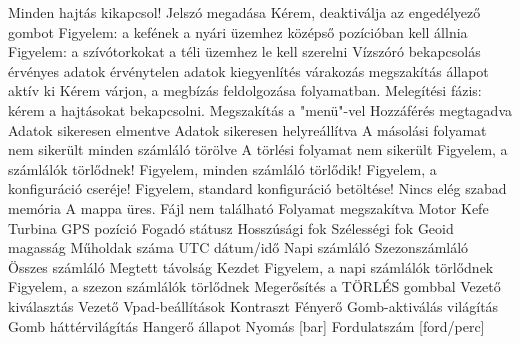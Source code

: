  {Minden hajtás kikapcsol!}
 {Jelszó megadása}
 {Kérem, deaktiválja az engedélyező gombot}
 {Figyelem: a kefének a nyári üzemhez középső pozícióban kell állnia}
 {Figyelem: a szívótorkokat a téli üzemhez le kell szerelni}
 {Vízszóró bekapcsolás}
 {érvényes adatok}
 {érvénytelen adatok}
 {kiegyenlítés}
 {várakozás}
 {megszakítás}
 {állapot}
 {aktív}
 {ki}
 {Kérem várjon, a megbízás feldolgozása folyamatban.}
 {Melegítési fázis: kérem a hajtásokat bekapcsolni.}
 {Megszakítás a "menü"-vel}
 {Hozzáférés megtagadva}
 {Adatok sikeresen elmentve}
 {Adatok sikeresen helyreállítva}
 {A másolási folyamat nem sikerült}
 {minden számláló törölve}
 {A törlési folyamat nem sikerült}
 {Figyelem, a számlálók törlődnek!}
 {Figyelem, minden számláló törlődik!}
 {Figyelem, a konfiguráció cseréje!}
 {Figyelem, standard konfiguráció betöltése!}
 {Nincs elég szabad memória}
 {A mappa üres.}
 {Fájl nem található}
 {Folyamat megszakítva}
 {Motor}
 {Kefe}
 {Turbina}
 {GPS pozíció}
 {Fogadó státusz}
 {Hosszúsági fok}
 {Szélességi fok}
 {Geoid magasság}
 {Műholdak száma}
 {UTC dátum/idő}
 {Napi számláló}
 {Szezonszámláló}
 {Összes számláló}
 {Megtett távolság}
 {Kezdet}
 {Figyelem, a napi számlálók törlődnek}
 {Figyelem, a szezon számlálók törlődnek}
 {Megerősítés a TÖRLÉS gombbal}
 {Vezető kiválasztás}
 {Vezető}
 {Vpad-beállítások}
 {Kontraszt}
 {Fényerő}
 {Gomb-aktiválás világítás}
 {Gomb háttérvilágítás}
 {Hangerő}
 {állapot}
 {Nyomás [bar]}
 {Fordulatszám [ford/perc]}
